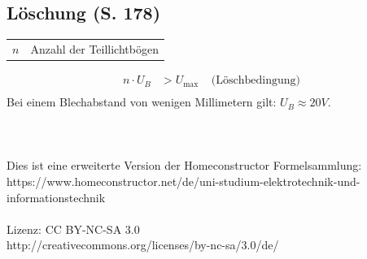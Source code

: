 \documentclass[a4paper,twocolumn,10pt]{article}
\begin{document}
\subsection{Löschung (S. 178)}
\begin{tabular}{ll}
$n$ & Anzahl der Teillichtbögen
\end{tabular}
\begin{equation*}
\begin{split}
n\cdot U_B&>U_{\text{max}}\;\;\;\;\text{(Löschbedingung)}\\
\end{split}
\end{equation*}
Bei einem Blechabstand von wenigen Millimetern gilt: $U_B\approx 20V$.
\\\\\\\\
Dies ist eine erweiterte Version der Homeconstructor Formelsammlung: https://www.homeconstructor.net/de/uni-studium-elektrotechnik-und-informationstechnik
\\\\
Lizenz: CC BY-NC-SA 3.0\\
http://creativecommons.org/licenses/by-nc-sa/3.0/de/
\end{document}
